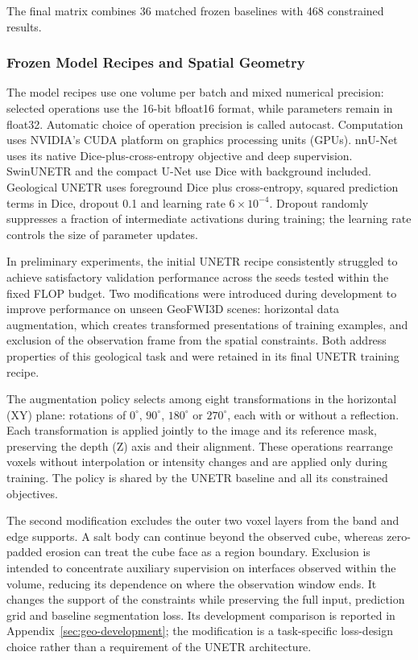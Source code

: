 \documentclass[12pt,a4paper]{article}
\begin{document}
The final matrix combines 36 matched frozen baselines with 468
constrained results. 

\subsubsection{Frozen Model Recipes and Spatial Geometry}

The model recipes use one volume per batch and mixed numerical precision:
selected operations use the 16-bit bfloat16 format, while parameters remain
in float32. Automatic choice of operation precision is called autocast.
Computation uses NVIDIA's CUDA platform on graphics processing units (GPUs).
nnU-Net uses its native Dice-plus-cross-entropy objective and deep
supervision. SwinUNETR and the compact U-Net use Dice with background
included. Geological UNETR uses foreground Dice plus cross-entropy, squared
prediction terms in Dice, dropout 0.1 and learning rate $6\times10^{-4}$.
Dropout randomly suppresses a fraction of intermediate activations during
training; the learning rate controls the size of parameter updates.

In preliminary experiments, the initial UNETR recipe consistently struggled
to achieve satisfactory validation performance across the seeds tested
within the fixed FLOP budget. Two modifications were introduced during
development to improve performance on unseen GeoFWI3D scenes: horizontal
data augmentation, which creates transformed presentations of training
examples, and exclusion of the observation frame from the spatial
constraints. Both address properties of this geological task and were
retained in its final UNETR training recipe.

The augmentation policy selects among eight transformations in the
horizontal (XY) plane: rotations of $0^\circ$, $90^\circ$, $180^\circ$
or $270^\circ$, each with or without a reflection. Each transformation
is applied jointly to the image and its reference mask, preserving the
depth (Z) axis and their alignment. These operations rearrange voxels
without interpolation or intensity changes and are applied only during
training. The policy is shared by the UNETR baseline and all its
constrained objectives.

The second modification excludes the outer two voxel layers from the
band and edge supports. A salt body can continue beyond the observed
cube, whereas zero-padded erosion can treat the cube face as a region
boundary. Exclusion is intended to concentrate auxiliary supervision
on interfaces observed within the volume, reducing its dependence on
where the observation window ends. It changes the support of the
constraints while preserving the full input, prediction grid and
baseline segmentation loss. Its development comparison is reported in
Appendix~\ref{sec:geo-development}; the modification is a task-specific
loss-design choice rather than a requirement of the UNETR architecture.
\end{document}
